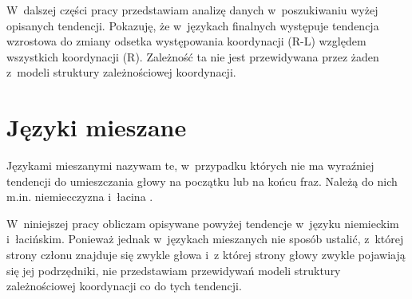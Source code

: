 W~dalszej części pracy przedstawiam analizę danych w~poszukiwaniu wyżej opisanych tendencji. Pokazuję, że w~językach finalnych występuje tendencja wzrostowa do zmiany odsetka występowania koordynacji (R-L) względem wszystkich koordynacji (R). Zależność ta nie jest przewidywana przez żaden z~modeli struktury zależnościowej koordynacji.


\section{Języki mieszane}

Językami mieszanymi nazywam te, w~przypadku których nie ma wyraźniej tendencji do umieszczania głowy na początku lub na końcu fraz. Należą do nich m.in. niemiecczyzna i~łacina \citep{polinsky2020headedness}.

W~niniejszej pracy obliczam opisywane powyżej tendencje w~języku niemieckim i~łacińskim. Ponieważ jednak w~językach mieszanych nie sposób ustalić, z~której strony członu znajduje się zwykle głowa i~z której strony głowy zwykle pojawiają się jej podrzędniki, nie przedstawiam przewidywań modeli struktury zależnościowej koordynacji co do tych tendencji. 
